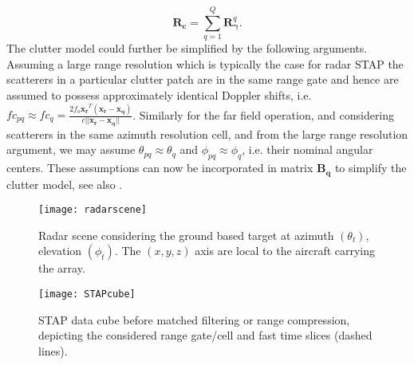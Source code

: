 \documentclass[11pt,draftclsnofoot,onecolumn]{IEEEtran}
\theoremstyle{definition}
\theoremstyle{remark}
\begin{document}
\begin{equation} \label{eq16}
\mathbf{R_c}=\sum\limits_{q=1}^Q \mathbf{R}_{\boldsymbol{\gamma}}^q.
\end{equation}
The clutter model could further be simplified by the following arguments. Assuming a large range resolution which is typically the case for radar STAP \cite{ward1994} the scatterers in a particular clutter patch are in the same range gate and hence are assumed to possess approximately identical Doppler shifts, i.e. $fc_{pq}\approx fc_q=\tfrac{2f_o\mathbf{\dot{x}_r}^T (\mathbf{x_r}-\mathbf{x_{q} })}{c||\mathbf{x_r}-\mathbf{x_{q} }||}$. Similarly for the far field operation, and considering scatterers in the same azimuth resolution cell, and from the large range resolution argument, we may assume $\theta_{pq}\approx \theta_q$ and $\phi_{pq}\approx \phi_{q}$, i.e. their nominal angular centers. These assumptions can now be incorporated in matrix $\mathbf{B_q}$ to simplify the clutter model, see also \cite{Setlurradar2013}.
\begin{figure*}[tbp!]
\begin{minipage}[b]{0.5\linewidth}
\centering
\texttt{[image: radarscene]}
\caption{Radar scene considering the ground based target at azimuth $(\theta_t)$, elevation $(\phi_t)$. The $(x,y,z)$ axis are local to the aircraft carrying the array.}
\label{fig1}
\end{minipage}
\hspace{0.4cm}
\begin{minipage}[b]{0.5\linewidth}
\centering
\texttt{[image: STAPcube]}
\caption{STAP data cube before matched filtering or range compression, depicting the considered range gate/cell and fast time slices (dashed lines).}
\label{fig2}
\end{minipage}
\end{figure*}
\end{document}
